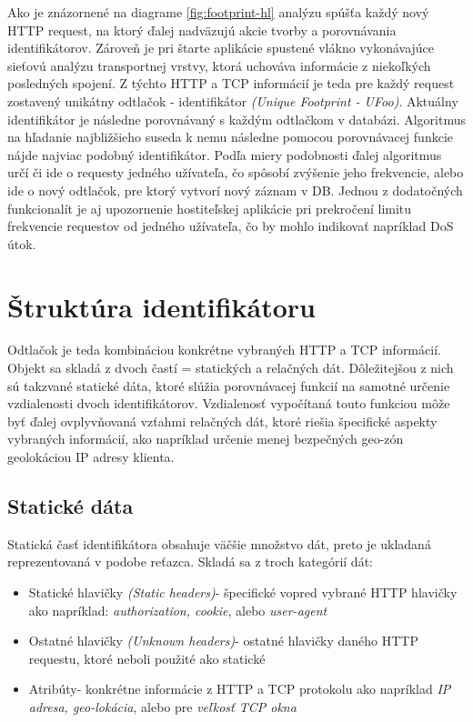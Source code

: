\documentclass[
  printed, %
  table,   %
  lof,     %
  lot,     %
]{fithesis3}
\begin{document}
Ako je znázornené na diagrame \ref{fig:footprint-hl} analýzu spúšťa každý nový
HTTP request, na ktorý ďalej nadväzujú akcie tvorby a porovnávania
identifikátorov. Zároveň je pri štarte aplikácie spustené vlákno vykonávajúce
sieťovú analýzu transportnej vrstvy, ktorá uchováva informácie z niekoľkých
posledných spojení. Z týchto HTTP a TCP informácií je teda pre každý request
zostavený unikátny odtlačok - identifikátor \textit{(Unique Footprint - UFoo)}.
Aktuálny identifikátor je následne porovnávaný s každým odtlačkom v databázi.
Algoritmus na hľadanie najbližšieho suseda k nemu následne pomocou porovnávacej
funkcie nájde najviac podobný identifikátor. Podľa miery podobnosti ďalej
algoritmus určí či ide o requesty jedného užívateľa, čo spôsobí zvýšenie jeho
frekvencie, alebo ide o nový odtlačok, pre ktorý vytvorí nový záznam v DB.
Jednou z dodatočných funkcionalít je aj upozornenie hostiteľskej aplikácie pri
prekročení limitu frekvencie requestov od jedného užívateľa, čo by mohlo
indikovať napríklad DoS útok.

\section{Štruktúra identifikátoru}
Odtlačok je teda kombináciou konkrétne vybraných HTTP a TCP informácií.
Objekt sa skladá z dvoch častí = statických a relačných dát. Dôležitejšou z
nich sú takzvané statické dáta, ktoré slúžia porovnávacej funkcií na samotné
určenie vzdialenosti dvoch identifikátorov. Vzdialenosť vypočítaná touto
funkciou môže byť ďalej ovplyvňovaná vzťahmi relačných dát, ktoré riešia
špecifické aspekty vybraných informácií, ako napríklad určenie menej bezpečných
geo-zón geolokáciou IP adresy klienta.

\subsection{Statické dáta}
Statická časť identifikátora obsahuje väčšie množstvo dát, preto je
ukladaná reprezentovaná v podobe reťazca. Skladá sa z troch kategórií dát:
\begin{itemize}
    \item Statické hlavičky \textit{(Static headers)}- špecifické vopred
    vybrané HTTP hlavičky ako napríklad: \textit{authorization, cookie}, alebo
    \textit{user-agent}
    \item Ostatné hlavičky \textit{(Unknown headers)}- ostatné hlavičky daného
    HTTP requestu, ktoré neboli použité ako statické
    \item Atribúty- konkrétne informácie z HTTP a TCP protokolu ako napríklad
    \textit{IP adresa, geo-lokácia}, alebo pre \textit{veľkosť TCP okna}
\end{itemize}
\end{document}
